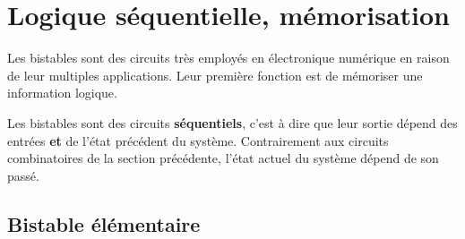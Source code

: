 \documentclass{../template/labo}
\begin{document}

\newpage
\section{Logique séquentielle, mémorisation}

\begin{info}
Les bistables sont des circuits très employés en électronique numérique en raison de leur multiples applications. Leur première fonction est de mémoriser une information logique.

Les bistables sont des circuits \textbf{séquentiels}, c'est à dire que leur sortie dépend des entrées \textbf{et} de l'état précédent du système. Contrairement aux circuits combinatoires de la section précédente, l'état actuel du système dépend de son passé.
\end{info}

\subsection{Bistable élémentaire}
\end{document}
